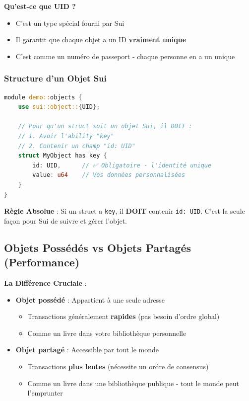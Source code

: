 \documentclass[11pt]{article}
\begin{document}
\begin{explainBox}
\textbf{Qu'est-ce que UID ?}
\begin{itemize}
  \item C'est un type spécial fourni par Sui
  \item Il garantit que chaque objet a un ID \textbf{vraiment unique}
  \item C'est comme un numéro de passeport - chaque personne en a un unique
\end{itemize}
\end{explainBox}

\subsubsection{Structure d'un Objet Sui}

\begin{lstlisting}[language=Rust, caption=Structure Basique d'un Objet Sui]
module demo::objects {
    use sui::object::{UID};
    
    // Pour qu'un struct soit un objet Sui, il DOIT :
    // 1. Avoir l'ability "key"
    // 2. Contenir un champ "id: UID"
    struct MyObject has key {
        id: UID,      // ✅ Obligatoire - l'identité unique
        value: u64    // Vos données personnalisées
    }
}
\end{lstlisting}

\begin{noteBox}
\textbf{Règle Absolue} : Si un struct a \texttt{key}, il \textbf{DOIT} contenir \texttt{id: UID}. C'est la seule façon pour Sui de suivre et gérer l'objet.
\end{noteBox}

\subsection{Objets Possédés vs Objets Partagés (Performance)}

\begin{explainBox}
\textbf{La Différence Cruciale} :
\begin{itemize}
  \item \textbf{Objet possédé} : Appartient à une seule adresse
  \begin{itemize}
    \item Transactions généralement \textbf{rapides} (pas besoin d'ordre global)
    \item Comme un livre dans votre bibliothèque personnelle
  \end{itemize}
  
  \item \textbf{Objet partagé} : Accessible par tout le monde
  \begin{itemize}
    \item Transactions \textbf{plus lentes} (nécessite un ordre de consensus)
    \item Comme un livre dans une bibliothèque publique - tout le monde peut l'emprunter
  \end{itemize}
\end{itemize}
\end{explainBox}
\end{document}
